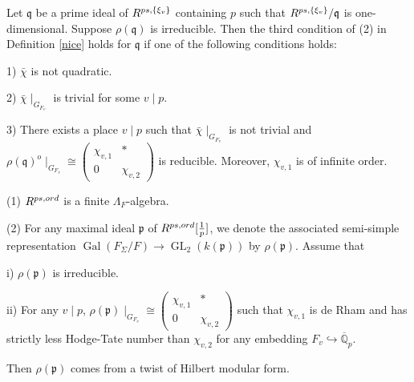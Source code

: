 \documentclass[10pt,a4paper]{amsart}
\begin{document}
\begin{prop}\label{equiv}
	Let $\mathfrak{q}$ be a prime ideal of $ R^{\textnormal{ps}, \{\xi_v\}}$ containing $p$ such that $ R^{\textnormal{ps}, \{\xi_v\}}/\mathfrak{q}$ is one-dimensional. Suppose $\rho(\mathfrak{q})$ is irreducible. Then the third condition of (2) in Definition \ref{nice} holds for $\mathfrak{q}$ if one of the following conditions holds:
	
	1)  $\bar{\chi}$ is not quadratic. 
	
	2) $\bar{\chi}\mid_{G_{F_v}}$ is trivial for some $v \mid p$.
	
	3) There exists a place $v \mid p$ such that $\bar{\chi}\mid_{G_{F_v}}$ is not trivial and $\rho(\mathfrak{q})^o\mid_{G_{F_v}} \cong \begin{pmatrix}
		\chi_{v,1} & *\\
		0 & \chi_{v,2}
	\end{pmatrix}$ is reducible. Moreover, $ \chi_{v,1}$ is of infinite order.
\end{prop}

\begin{prop}\label{ordinary}
	(1) $ R^{\textnormal{ps,ord}}$ is a finite $ \Lambda_F$-algebra. 
	
	(2) For any maximal ideal $\mathfrak{p}$ of $R^{\textnormal{ps,ord}}[\frac{1}{p}]$, we denote the associated semi-simple representation $\operatorname{Gal}(F_{\Sigma}/F) \to \operatorname{GL}_2(k(\mathfrak{p}))$ by $\rho(\mathfrak{p})$. Assume that
	
	\quad i) $ \rho(\mathfrak{p})$ is irreducible.
	
	\quad ii) For any $v \mid p$, $\rho(\mathfrak{p}) \mid_{G_{F_v}} \cong  \begin{pmatrix}
		\chi_{v,1} & *\\
		0 & \chi_{v,2}
	\end{pmatrix}$ such that $\chi_{v,1} $ is de Rham and has strictly less Hodge-Tate number than $\chi_{v,2} $ for any embedding $F_v \hookrightarrow \overline{\mathbb{Q}}_p$.
	
	Then $ \rho(\mathfrak{p})$ comes from a twist of Hilbert modular form.
\end{prop}
\end{document}
